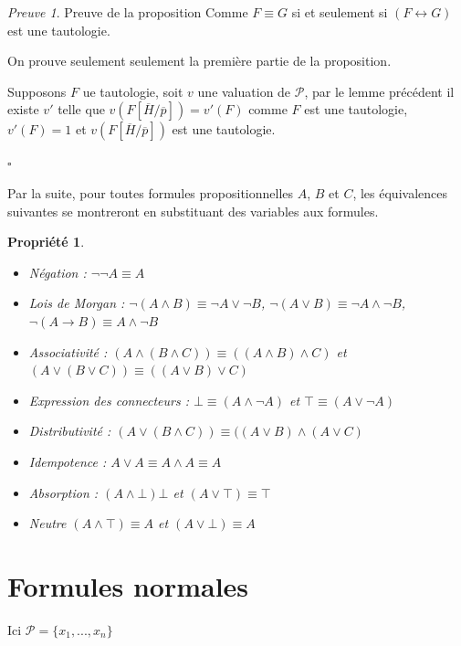 \documentclass[]{article}
\newtheorem{myproperty}{Propriété}
\theoremstyle{remark}
\newtheorem{myproof}{Preuve}
\theoremstyle{definition}
\newcommand{\cqfd}{
	\hfill$\square$
}
\begin{document}
\begin{myproof}Preuve de la proposition
	Comme $F \equiv G$ si et seulement si $(F \longleftrightarrow G)$ est une tautologie.
	
	On prouve seulement seulement la première partie de la proposition.
	
	Supposons $F$ ue tautologie, soit $v$ une valuation de $\mathcal{P}$, par le lemme précédent il existe $v'$ telle que $v(F[\overline{H}/\overline{p}])=v'(F)$ comme $F$ est une tautologie, $v'(F)=1$ et $v(F[\overline{H}/\overline{p}])$ est une tautologie.
	
	\cqfd
\end{myproof}

Par la suite, pour toutes formules propositionnelles $A$, $B$ et $C$, les équivalences suivantes se montreront en substituant des variables aux formules.

\begin{myproperty}
	\leavevmode
	\begin{itemize}
		\item Négation : $\neg\neg A \equiv A$
		\item Lois de Morgan : $\neg(A \land B) \equiv \neg A \lor \neg B$, $\neg(A \lor B) \equiv \neg A \land \neg B$, $\neg (A \longrightarrow B) \equiv A \land \neg B$
		\item Associativité : $(A \land (B \land C)) \equiv ((A \land B) \land C
		)$ et $(A \lor (B \lor C)) \equiv ((A \lor B) \lor C
				)$
				
		\item Expression des connecteurs : $\bot \equiv (A \land \neg A)$ et $\top \equiv (A \lor \neg A)$
		
		\item Distributivité : $(A\lor (B \land C)) \equiv ((A \lor B) \land (A \lor C)$
		\item Idempotence : $A \lor A \equiv  A \land A \equiv A$
		\item Absorption : $(A \land \bot) \bot$ et $(A \lor \top) \equiv \top$
		\item Neutre $(A \land \top) \equiv A$ et $(A \lor \bot) \equiv A$
	\end{itemize}
\end{myproperty}

\section{Formules normales}

Ici $\mathcal{P}=\{x_1, ..., x_n\}$
\end{document}
